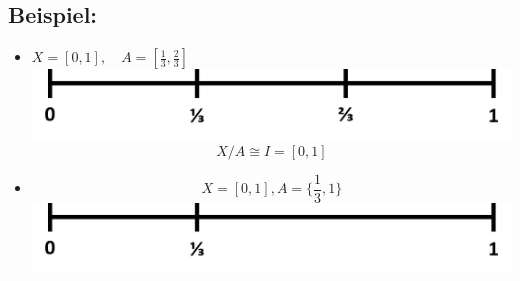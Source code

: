 \documentclass[a4paper,11pt,notitlepage]{report}
\theoremstyle{definition}
\newenvironment{bsp}[1]
{
\setlength{\fboxsep}{10pt}
\subsection*{Beispiel: #1}
\begin{upshape}
}
{
\end{upshape}
}
\begin{document}
\begin{bsp}{}
	\begin{itemize}
		\item $X = [0,1], \quad A = [\frac{1}{3}, \frac{2}{3}]$ \includegraphics[scale=0.4]{images/0_1_drittel.png}
	$$X/A \cong I = [0,1]$$
		\item $$ X = [0,1], A = \{\frac{1}{3}, 1\}$$ \includegraphics[scale=0.4]{images/0_1_drittel_2.png}

\end{itemize}
\end{bsp}
\end{document}
